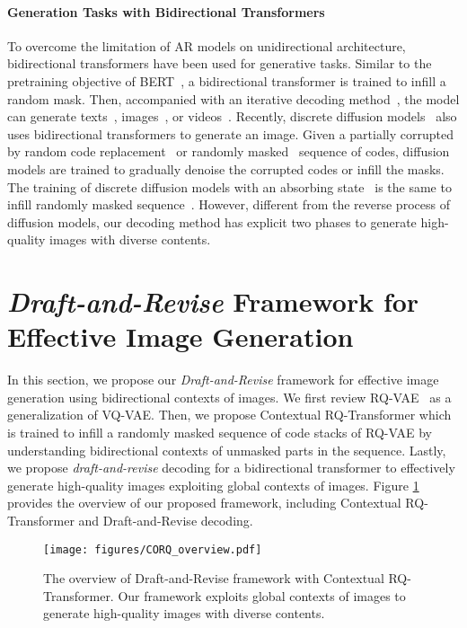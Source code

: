 \documentclass{article}
\begin{document}
\paragraph{Generation Tasks with Bidirectional Transformers}
To overcome the limitation of AR models on unidirectional architecture, bidirectional transformers have been used for generative tasks.
Similar to the pretraining objective of BERT~\cite{BERT}, a bidirectional transformer is trained to infill a random mask.
Then, accompanied with an iterative decoding method~\cite{mask-predict,GLAT,SUNDAE,BERT-speak}, the model can generate texts~\cite{mask-predict}, images~\cite{MaskGIT}, or videos~\cite{ShowMeWhat,M6UFC}.
Recently, discrete diffusion models~\cite{D3PM,UnleashingTransformer,ImageBART,VQDiff} also uses bidirectional transformers to generate an image.
Given a partially corrupted by random code replacement~\cite{D3PM,ImageBART} or randomly masked~\cite{D3PM,UnleashingTransformer,VQDiff} sequence of codes, diffusion models are trained to gradually denoise the corrupted codes or infill the masks.
The training of discrete diffusion models with an absorbing state~\cite{D3PM} is the same to infill randomly masked sequence~\cite{MaskGIT,UnleashingTransformer}.
However, different from the reverse process of diffusion models, our decoding method has explicit two phases to generate high-quality images with diverse contents.


\section{\emph{Draft-and-Revise} Framework for Effective Image Generation} \label{sec:methods}
In this section, we propose our \emph{Draft-and-Revise} framework for effective image generation using bidirectional contexts of images. 
We first review RQ-VAE~\cite{RQVAE} as a generalization of VQ-VAE.
Then, we propose Contextual RQ-Transformer which is trained to infill a randomly masked sequence of code stacks of RQ-VAE by understanding bidirectional contexts of unmasked parts in the sequence.
Lastly, we propose \emph{draft-and-revise} decoding for a bidirectional transformer to effectively generate high-quality images exploiting global contexts of images. Figure \ref{fig:overview} provides the overview of our proposed framework, including Contextual RQ-Transformer and Draft-and-Revise decoding.


\begin{figure}
\centering
\texttt{[image: figures/CORQ\_overview.pdf]}
\caption{The overview of Draft-and-Revise framework with Contextual RQ-Transformer. Our framework exploits global contexts of images to generate high-quality images with diverse contents.}
\label{fig:overview}
\end{figure}
\end{document}
